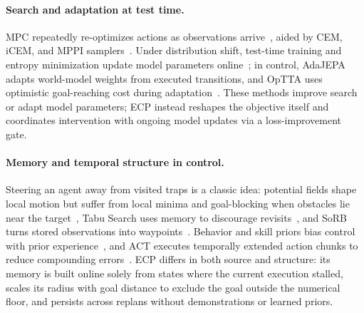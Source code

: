 \paragraph{Search and adaptation at test time.}
MPC repeatedly re-optimizes actions as observations arrive~\cite{garcia1989mpc}, aided by CEM, iCEM, and MPPI samplers~\cite{rubinstein1999cem,pinneri2021icem,williams2017mppi}. Under distribution shift, test-time training and entropy minimization update model parameters online~\cite{sun2020ttt,wang2021tent}; in control, AdaJEPA adapts world-model weights from executed transitions, and OpTTA uses optimistic goal-reaching cost during adaptation~\cite{wang2026adajepa,mete2026optta}. These methods improve search or adapt model parameters; ECP instead reshapes the objective itself and coordinates intervention with ongoing model updates via a loss-improvement gate.

\paragraph{Memory and temporal structure in control.}
Steering an agent away from visited traps is a classic idea: potential fields shape local motion but suffer from local minima and goal-blocking when obstacles lie near the target~\cite{khatib1986potential,koren1991potential}, Tabu Search uses memory to discourage revisits~\cite{glover1989tabu}, and SoRB turns stored observations into waypoints~\cite{eysenbach2019sorb}. Behavior and skill priors bias control with prior experience~\cite{tirumala2022behaviorpriors,pertsch2021spirl}, and ACT executes temporally extended action chunks to reduce compounding errors~\cite{zhao2023act}. ECP differs in both source and structure: its memory is built online solely from states where the current execution stalled, scales its radius with goal distance to exclude the goal outside the numerical floor, and persists across replans without demonstrations or learned priors.
